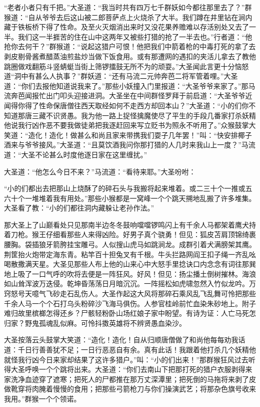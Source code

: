 \documentclass[12pt,UTF8]{ctexbook}
\begin{document}
“老者小者只有千把。”大圣道：“我当时共有四万七千群妖如今都往那里去了？”群猴道：“自从爷爷去后这山被二郎菩萨点上火烧杀了大半。我们蹲在井里钻在涧内藏于铁板桥下得了性命。及至火灭烟消出来时又没花果养赡难以存活别处又去了一半。我们这一半捱苦的住在山中这两年又被些打猎的抢了一半去也。”行者道：“他抢你去何干？”群猴道：“说起这猎户可恨！他把我们中箭着枪的中毒打死的拿了去剥皮剔骨酱煮醋蒸油煎盐炒当做下饭食用。或有那遭网的遇扣的夹活儿拿去了教他跳圈做戏翻筋斗竖蜻蜓当街上筛锣擂鼓无所不为的顽耍。”大圣闻此言更十分恼怒道“洞中有甚么人执事？”群妖道：“还有马流二元帅奔芭二将军管着哩。”大圣道：“你们去报他知道说我来了。”那些小妖撞入门里报道：“大圣爷爷来家了。”那马流奔芭闻报忙出门叩头迎接进洞。大圣坐在中间群怪罗拜于前启道：“大圣爷爷近闻得你得了性命保唐僧往西天取经如何不走西方却回本山？”大圣道：“小的们你不知道那唐三藏不识贤愚。我为他一路上捉怪擒魔使尽了平生的手段几番家打杀妖精他说我行凶作恶不要我做徒弟把我逐赶回来写立贬书为照永不听用了。”众猴鼓掌大笑道：“造化！造化！做甚么和尚且家来带携我们耍子几年罢！”叫：“快安排椰子酒来与爷爷接风。”大圣道：“且莫饮酒我问你那打猎的人几时来我山上一度？”马流道：“大圣不论甚么时度他逐日家在这里缠扰。”

大圣道：“他怎么今日不来？”马流道：“看待来耶。”大圣吩咐：

“小的们都出去把那山上烧酥了的碎石头与我搬将起来堆着。或二三十个一推或五六十个一堆堆着我有用处。”那些小猴都是一窝峰一个个跳天搠地乱搬了许多堆集。大圣看了教：“小的们都往洞内藏躲让老孙作法。”

那大圣上了山巅看处只见那南半边冬冬鼓响噹噹锣鸣闪上有千余人马都架着鹰犬持着刀枪。猴王仔细看那些人来得凶险。好男子真个骁勇！但见：狐皮苫肩顶锦绮裹腰胸。袋插狼牙箭胯挂宝雕弓。人似搜山虎马如跳涧龙。成群引着犬满膀架其鹰。荆筐抬火炮带定海东青。粘竿百十担兔叉有千根。牛头拦路网阎王扣子绳一齐乱吆喝散撒满天星。大圣见那些人布上他的山来心中大怒手里捻诀口内念念有词往那巽地上吸了一口气呼的吹将去便是一阵狂风。好风！但见：扬尘播土倒树摧林。海浪如山耸浑波万迭侵。乾坤昏荡荡日月暗沉沉。一阵摇松如虎啸忽然入竹似龙吟。万窍怒号天噫气飞砂走石乱伤人。大圣作起这大风将那碎石乘风乱飞乱舞可怜把那些千余人马一个个石打乌头粉碎沙飞海马俱伤。人参官桂岭前忙血染朱砂地上。附子难归故里槟榔怎得还乡？尸骸轻粉卧山场红娘子家中盼望。有诗为证：人亡马死怎归家？野鬼孤魂乱似麻。可怜抖擞英雄将不辨贤愚血染沙。

大圣按落云头鼓掌大笑道：“造化！造化！自从归顺唐僧做了和尚他每每劝我话道：千日行善善犹不足；一日行恶恶自有余。真有此话！我跟着他打杀几个妖精他就怪我行凶今日来家却结果了这许多猎户。”叫：“小的们出来！”那群猴狂风过去听得大圣呼唤一个个跳将出来。大圣道：“你们去南山下把那打死的猎户衣服剥得来家洗净血迹穿了遮寒；把死人的尸都推在那万丈深潭里；把死倒的马拖将来剥了皮做靴穿将肉腌着慢慢的食用；把那些弓箭枪刀与你们操演武艺；将那杂色旗号收来我用。”群猴一个个领诺。
\end{document}
